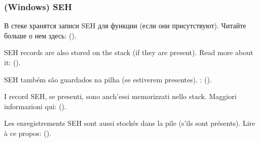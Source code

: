 \subsubsection{(Windows) SEH}

\ifdefined\RUSSIAN
В стеке хранятся записи \ac{SEH} для функции (если они присутствуют).
Читайте больше о нем здесь: ().
\fi %

\ifdefined\ENGLISH
\ac{SEH} records are also stored on the stack (if they are present).
Read more about it: ().
\fi %

\ifdefined\BRAZILIAN
\ac{SEH} também são guardados na pilha (se estiverem presentes).
\PTBRph{}: ().
\fi %

\ifdefined\ITALIAN
I record \ac{SEH}, se presenti, sono anch'essi memorizzati nello stack.
Maggiori informazioni qui: ().
\fi %

\ifdefined\FRENCH
Les enregistrements \ac{SEH} sont aussi stockés dans la pile (s'ils sont présents).
Lire à ce propos: ().
\fi %
